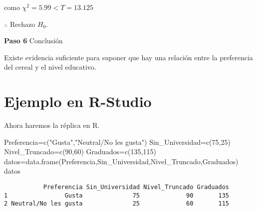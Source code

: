 \documentclass[
  a4paper,
  oneside,
  openany]{book}
\newenvironment{Shaded}{\begin{snugshade}}{\end{snugshade}}
\newcommand{\DecValTok}[1]{\textcolor[rgb]{0.00,0.00,0.81}{#1}}
\newcommand{\FunctionTok}[1]{\textcolor[rgb]{0.00,0.00,0.00}{#1}}
\newcommand{\NormalTok}[1]{#1}
\newcommand{\OtherTok}[1]{\textcolor[rgb]{0.56,0.35,0.01}{#1}}
\newcommand{\StringTok}[1]{\textcolor[rgb]{0.31,0.60,0.02}{#1}}
\begin{document}
como \(\chi^2=5.99 < T=13.125\)

\(\therefore\) Rechazo \(H_0\).

\textbf{Paso 6} Conclusión

Existe evidencia suficiente para suponer que hay una relación entre la preferencia del cereal y el nivel educativo.

\hypertarget{ejemplo-en-r-studio-10}{%
\section{Ejemplo en R-Studio}\label{ejemplo-en-r-studio-10}}

Ahora haremos la réplica en R.

\begin{Shaded}
\begin{Highlighting}[]
\NormalTok{Preferencia}\OtherTok{=}\FunctionTok{c}\NormalTok{(}\StringTok{"Gusta"}\NormalTok{,}\StringTok{"Neutral/No les gusta"}\NormalTok{)}
\NormalTok{Sin\_Universidad}\OtherTok{=}\FunctionTok{c}\NormalTok{(}\DecValTok{75}\NormalTok{,}\DecValTok{25}\NormalTok{)}
\NormalTok{Nivel\_Truncado}\OtherTok{=}\FunctionTok{c}\NormalTok{(}\DecValTok{90}\NormalTok{,}\DecValTok{60}\NormalTok{)}
\NormalTok{Graduados}\OtherTok{=}\FunctionTok{c}\NormalTok{(}\DecValTok{135}\NormalTok{,}\DecValTok{115}\NormalTok{)}
\NormalTok{datos}\OtherTok{=}\FunctionTok{data.frame}\NormalTok{(Preferencia,Sin\_Universidad,Nivel\_Truncado,Graduados)}
\NormalTok{datos}
\end{Highlighting}
\end{Shaded}

\begin{verbatim}
           Preferencia Sin_Universidad Nivel_Truncado Graduados
1                Gusta              75             90       135
2 Neutral/No les gusta              25             60       115
\end{verbatim}
\end{document}
